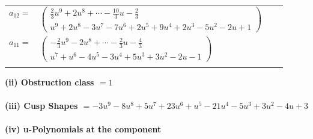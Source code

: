 \documentclass[1p]{elsarticle_modified}
\theoremstyle{definition}
\begin{document}
\begin{tabular}{m{7pt} m{180pt} m{7pt} m{180pt} }
\flushright $a_{12}=$&$\begin{pmatrix}\frac{2}{3} u^9+2 u^8+\cdots-\frac{10}{3} u-\frac{2}{3}\\u^9+2 u^8-3 u^7-7 u^6+2 u^5+9 u^4+2 u^3-5 u^2-2 u+1\end{pmatrix}$ \\
\flushright $a_{11}=$&$\begin{pmatrix}-\frac{2}{3} u^9-2 u^8+\cdots-\frac{2}{3} u-\frac{4}{3}\\u^7+u^6-4 u^5-3 u^4+5 u^3+3 u^2-2 u-1\end{pmatrix}$\\&\end{tabular}
\flushleft \textbf{(ii) Obstruction class $= 1$}\\~\\
\flushleft \textbf{(iii) Cusp Shapes $= -3 u^9-8 u^8+5 u^7+23 u^6+u^5-21 u^4-5 u^3+3 u^2-4 u+3$}\\~\\
\newpage\renewcommand{\arraystretch}{1}
\flushleft \textbf{(iv) u-Polynomials at the component}\newline \\
\end{document}
